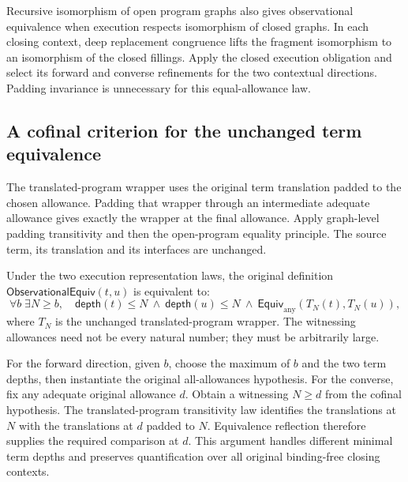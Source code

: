 


Recursive isomorphism of open program graphs also gives observational
equivalence when execution respects isomorphism of closed graphs. In each
closing context, deep replacement congruence lifts the fragment isomorphism
to an isomorphism of the closed fillings. Apply the closed execution obligation
and select its forward and converse refinements for the two contextual
directions. Padding invariance is unnecessary for this equal-allowance law.



\subsection{A cofinal criterion for the unchanged term equivalence}

The translated-program wrapper uses the original term translation padded to
the chosen allowance. Padding that wrapper through an intermediate adequate
allowance gives exactly the wrapper at the final allowance. Apply graph-level
padding transitivity and then the open-program equality principle. The source
term, its translation and its interfaces are unchanged.



Under the two execution representation laws, the original definition
$\mathsf{ObservationalEquiv}(t,u)$ is equivalent to:
\[
 \forall b\;\exists N\geq b,\quad
 \mathsf{depth}(t)\leq N\ \land\ \mathsf{depth}(u)\leq N\ \land\
 \mathsf{Equiv}_{\mathrm{any}}(T_N(t),T_N(u)),
\]
where $T_N$ is the unchanged translated-program wrapper. The witnessing
allowances need not be every natural number; they must be arbitrarily large.

For the forward direction, given $b$, choose the maximum of $b$ and the two
term depths, then instantiate the original all-allowances hypothesis. For the
converse, fix any adequate original allowance $d$. Obtain a witnessing
$N\geq d$ from the cofinal hypothesis. The translated-program transitivity
law identifies the translations at $N$ with the translations at $d$ padded
to $N$. Equivalence reflection therefore supplies the required comparison
at $d$. This argument handles different minimal term depths and preserves
quantification over all original binding-free closing contexts.

